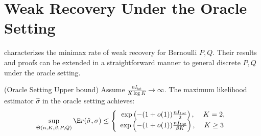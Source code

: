 \documentclass{article}
\begin{document}
\section{Weak Recovery Under the Oracle Setting}

\cite{zhangminimax} characterizes the minimax rate of weak recovery for Bernoulli $P,Q$. Their results and proofs can be extended in a straightforward manner to general discrete $P,Q$ under the oracle setting. 

\begin{proposition} 
\label{prop:weak_recovery_oracle}
(Oracle Setting Upper bound)
Assume $\frac{n I_{tot}}{K \log K} \rightarrow \infty$. The maximum likelihood estimator $\hat{\sigma}$ in the oracle setting achieves:
\[
\sup_{\Theta(n, K, \beta, P, Q)} \E r(\hat{\sigma}, \sigma) \leq \left\{ 
    \begin{array}{cc} 
   \exp \left( - (1 + o(1)) \frac{nI_{tot}}{2} \right ), \, & K=2, \\
   \exp \left( - (1 + o(1)) \frac{nI_{tot}}{\beta K} \right ), \,& K\geq 3
  \end{array} \right. 
\]   
\end{proposition}
\end{document}
